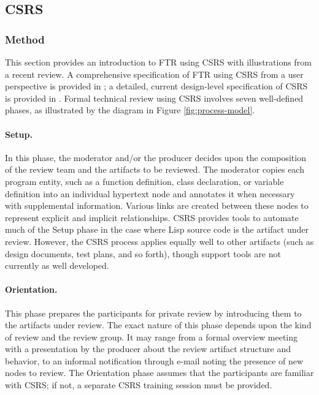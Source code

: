

\subsection{CSRS}
\label{sec:csrs}

\subsubsection{Method}

This section provides an introduction to FTR using CSRS with illustrations
from a recent review.  A comprehensive specification of FTR using CSRS from
a user perspective is provided in \cite{csdl-93-11}; a detailed, current
design-level specification of CSRS is provided in \cite{csdl-92-11}.
Formal technical review using CSRS involves seven well-defined phases, as
illustrated by the diagram in Figure \ref{fig:process-model}.

\paragraph{Setup.} In this phase, the moderator and/or the producer decides upon
the composition of the review team and the artifacts to be reviewed.  The
moderator copies each program entity, such as a function definition, class
declaration, or variable definition into an individual hypertext node and
annotates it when necessary with supplemental information.  Various links
are created between these nodes to represent explicit and implicit
relationships. CSRS provides tools to automate much of the Setup phase in
the case where Lisp source code is the artifact under review.  However, the
CSRS process applies equally well to other artifacts (such as design
documents, test plans, and so forth), though support tools are not
currently as well developed.

\paragraph{Orientation.} This phase prepares the participants for private
review by introducing them to the artifacts under review.  The exact nature
of this phase depends upon the kind of review and the review group.  It may
range from a formal overview meeting with a presentation by the producer
about the review artifact structure and behavior, to an informal
notification through e-mail noting the presence of new nodes to review.
The Orientation phase assumes that the participants are familiar with CSRS;
if not, a separate CSRS training session must be provided.

